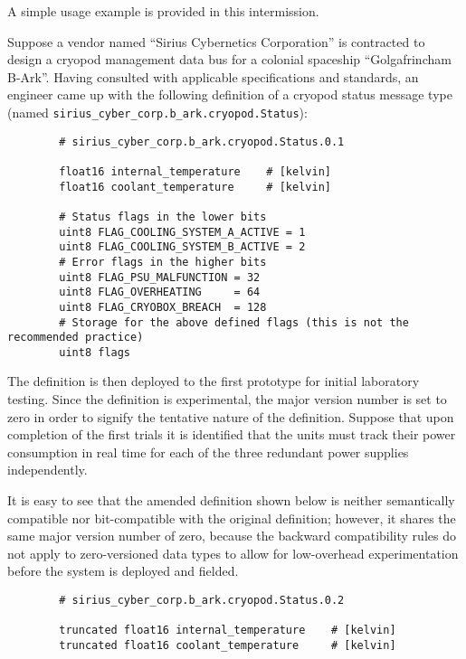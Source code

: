 \begin{remark}[breakable]
    A simple usage example is provided in this intermission.

    Suppose a vendor named ``Sirius Cybernetics Corporation'' is contracted to design a
    cryopod management data bus for a colonial spaceship ``Golgafrincham B-Ark''.
    Having consulted with applicable specifications and standards, an engineer came up with the following
    definition of a cryopod status message type (named \verb|sirius_cyber_corp.b_ark.cryopod.Status|):

    \begin{verbatim}
        # sirius_cyber_corp.b_ark.cryopod.Status.0.1

        float16 internal_temperature    # [kelvin]
        float16 coolant_temperature     # [kelvin]

        # Status flags in the lower bits
        uint8 FLAG_COOLING_SYSTEM_A_ACTIVE = 1
        uint8 FLAG_COOLING_SYSTEM_B_ACTIVE = 2
        # Error flags in the higher bits
        uint8 FLAG_PSU_MALFUNCTION = 32
        uint8 FLAG_OVERHEATING     = 64
        uint8 FLAG_CRYOBOX_BREACH  = 128
        # Storage for the above defined flags (this is not the recommended practice)
        uint8 flags
    \end{verbatim}

    The definition is then deployed to the first prototype for initial laboratory testing.
    Since the definition is experimental, the major version number is set to zero in order to signify the
    tentative nature of the definition.
    Suppose that upon completion of the first trials it is identified that the units must track their power consumption
    in real time for each of the three redundant power supplies independently.

    It is easy to see that the amended definition shown below is neither semantically compatible nor bit-compatible
    with the original definition; however, it shares the same major version number of zero, because the backward
    compatibility rules do not apply to zero-versioned data types to allow for low-overhead experimentation
    before the system is deployed and fielded.

    \begin{verbatim}
        # sirius_cyber_corp.b_ark.cryopod.Status.0.2

        truncated float16 internal_temperature    # [kelvin]
        truncated float16 coolant_temperature     # [kelvin]


\end{verbatim}
\end{remark}
